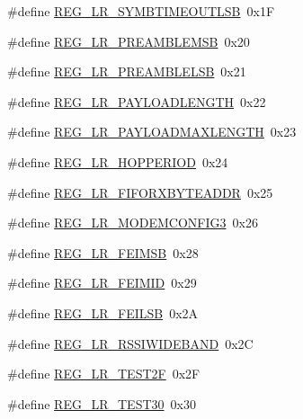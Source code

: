 \begin{DoxyCompactItemize}
\#define \mbox{\hyperlink{sx1276_regs-_lo_ra_8h_a7759fc860cf446c7e1a92a823a89ea31}{R\+E\+G\+\_\+\+L\+R\+\_\+\+S\+Y\+M\+B\+T\+I\+M\+E\+O\+U\+T\+L\+SB}}~0x1F
\item 
\#define \mbox{\hyperlink{sx1276_regs-_lo_ra_8h_a786457a6b4788117f8a2b994e68344ba}{R\+E\+G\+\_\+\+L\+R\+\_\+\+P\+R\+E\+A\+M\+B\+L\+E\+M\+SB}}~0x20
\item 
\#define \mbox{\hyperlink{sx1276_regs-_lo_ra_8h_a4449a1e2b055269d13034ebb4ba705b2}{R\+E\+G\+\_\+\+L\+R\+\_\+\+P\+R\+E\+A\+M\+B\+L\+E\+L\+SB}}~0x21
\item 
\#define \mbox{\hyperlink{sx1276_regs-_lo_ra_8h_a702e1e9ac301d26eb08fed50b90c6718}{R\+E\+G\+\_\+\+L\+R\+\_\+\+P\+A\+Y\+L\+O\+A\+D\+L\+E\+N\+G\+TH}}~0x22
\item 
\#define \mbox{\hyperlink{sx1276_regs-_lo_ra_8h_ae71e7acfa7c8c737e55349e72c71349f}{R\+E\+G\+\_\+\+L\+R\+\_\+\+P\+A\+Y\+L\+O\+A\+D\+M\+A\+X\+L\+E\+N\+G\+TH}}~0x23
\item 
\#define \mbox{\hyperlink{sx1276_regs-_lo_ra_8h_a829b59cc8b18d86904af96d1dc60add2}{R\+E\+G\+\_\+\+L\+R\+\_\+\+H\+O\+P\+P\+E\+R\+I\+OD}}~0x24
\item 
\#define \mbox{\hyperlink{sx1276_regs-_lo_ra_8h_a71cd184cd1fae95aeb458d8361d51cdd}{R\+E\+G\+\_\+\+L\+R\+\_\+\+F\+I\+F\+O\+R\+X\+B\+Y\+T\+E\+A\+D\+DR}}~0x25
\item 
\#define \mbox{\hyperlink{sx1276_regs-_lo_ra_8h_aecf214e63c69601e543629269b0401c7}{R\+E\+G\+\_\+\+L\+R\+\_\+\+M\+O\+D\+E\+M\+C\+O\+N\+F\+I\+G3}}~0x26
\item 
\#define \mbox{\hyperlink{sx1276_regs-_lo_ra_8h_a71a7b80d5f8a8c64cd63ea8d81a33d26}{R\+E\+G\+\_\+\+L\+R\+\_\+\+F\+E\+I\+M\+SB}}~0x28
\item 
\#define \mbox{\hyperlink{sx1276_regs-_lo_ra_8h_a300ed0b1d23a5723176cfb26dcf2b32c}{R\+E\+G\+\_\+\+L\+R\+\_\+\+F\+E\+I\+M\+ID}}~0x29
\item 
\#define \mbox{\hyperlink{sx1276_regs-_lo_ra_8h_a515106b61bc60484b381cc58afa28b6e}{R\+E\+G\+\_\+\+L\+R\+\_\+\+F\+E\+I\+L\+SB}}~0x2A
\item 
\#define \mbox{\hyperlink{sx1276_regs-_lo_ra_8h_a98748f71ec5ffb1945bf8fa7a91a5d45}{R\+E\+G\+\_\+\+L\+R\+\_\+\+R\+S\+S\+I\+W\+I\+D\+E\+B\+A\+ND}}~0x2C
\item 
\#define \mbox{\hyperlink{sx1276_regs-_lo_ra_8h_af5f1829a69cb2a95243952ffa751a4c9}{R\+E\+G\+\_\+\+L\+R\+\_\+\+T\+E\+S\+T2F}}~0x2F
\item 
\#define \mbox{\hyperlink{sx1276_regs-_lo_ra_8h_a74451ab459bd0f482dde3ee50592390b}{R\+E\+G\+\_\+\+L\+R\+\_\+\+T\+E\+S\+T30}}~0x30

\end{DoxyCompactItemize}
